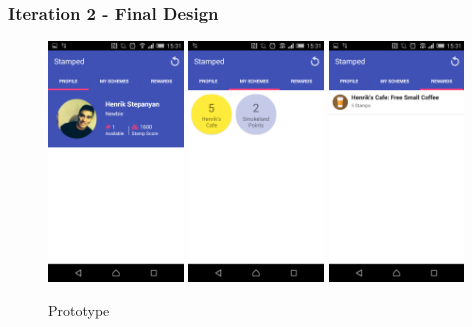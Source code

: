 \subsubsection{Iteration 2 - Final Design}
\begin{figure}[H]
 \centering
  \includegraphics[width=0.32\textwidth]{img/moremock2.png}
   \includegraphics[width=0.32\textwidth]{img/finalmock.png}
    \includegraphics[width=0.32\textwidth]{img/moremock1.png}
     \caption{Prototype}
\end{figure}

